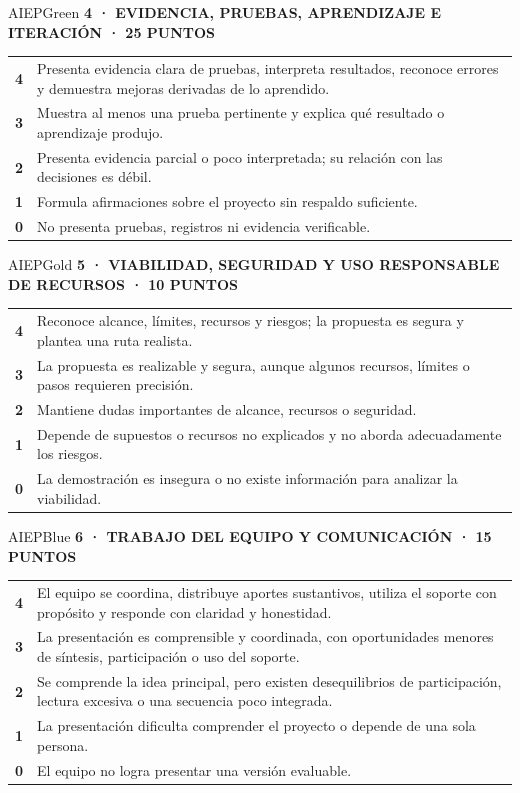 \documentclass[10pt,a4paper]{article}
\newcommand{\labeltext}[1]{%
  {\scriptsize\bfseries\color{AIEPSlate}\MakeUppercase{#1}}\par\vspace{1.2mm}
}
\begin{document}
\begin{softcard}{AIEPGreen}
\labeltext{4 · Evidencia, pruebas, aprendizaje e iteración · 25 puntos}
\begin{tabularx}{\textwidth}{@{}C{11mm}Y@{}}
\textbf{4} & Presenta evidencia clara de pruebas, interpreta resultados, reconoce errores y demuestra mejoras derivadas de lo aprendido.\\
\textbf{3} & Muestra al menos una prueba pertinente y explica qué resultado o aprendizaje produjo.\\
\textbf{2} & Presenta evidencia parcial o poco interpretada; su relación con las decisiones es débil.\\
\textbf{1} & Formula afirmaciones sobre el proyecto sin respaldo suficiente.\\
\textbf{0} & No presenta pruebas, registros ni evidencia verificable.\\
\end{tabularx}
\end{softcard}

\begin{softcard}{AIEPGold}
\labeltext{5 · Viabilidad, seguridad y uso responsable de recursos · 10 puntos}
\begin{tabularx}{\textwidth}{@{}C{11mm}Y@{}}
\textbf{4} & Reconoce alcance, límites, recursos y riesgos; la propuesta es segura y plantea una ruta realista.\\
\textbf{3} & La propuesta es realizable y segura, aunque algunos recursos, límites o pasos requieren precisión.\\
\textbf{2} & Mantiene dudas importantes de alcance, recursos o seguridad.\\
\textbf{1} & Depende de supuestos o recursos no explicados y no aborda adecuadamente los riesgos.\\
\textbf{0} & La demostración es insegura o no existe información para analizar la viabilidad.\\
\end{tabularx}
\end{softcard}

\begin{softcard}{AIEPBlue}
\labeltext{6 · Trabajo del equipo y comunicación · 15 puntos}
\begin{tabularx}{\textwidth}{@{}C{11mm}Y@{}}
\textbf{4} & El equipo se coordina, distribuye aportes sustantivos, utiliza el soporte con propósito y responde con claridad y honestidad.\\
\textbf{3} & La presentación es comprensible y coordinada, con oportunidades menores de síntesis, participación o uso del soporte.\\
\textbf{2} & Se comprende la idea principal, pero existen desequilibrios de participación, lectura excesiva o una secuencia poco integrada.\\
\textbf{1} & La presentación dificulta comprender el proyecto o depende de una sola persona.\\
\textbf{0} & El equipo no logra presentar una versión evaluable.\\
\end{tabularx}
\end{softcard}
\end{document}
